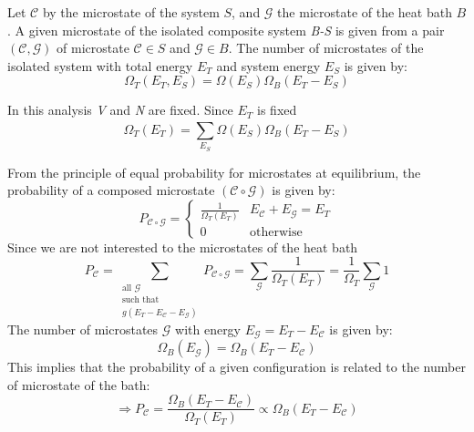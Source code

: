 \documentclass[../main/main.tex]{subfiles}
\begin{document}
Let \( \mathcal{C}  \) by the microstate of the system \( S \), and \( \mathcal{G}  \) the microstate of the heat bath \( B \).
A given microstate of the isolated composite system \emph{B-S} is given from a pair \( (\mathcal{C},\mathcal{G}  ) \) of microstate \( \mathcal{C} \in S  \) and   \( \mathcal{G} \in B  \).
The number of microstates of the isolated system with total energy \( E_T \) and system energy \( E_S \)  is given by:
\begin{equation}
  \Omega _T (E_T,E_S) = \Omega (E_S) \Omega _B (E_T - E_S)
\end{equation}
\begin{remark}
In this analysis \emph{V} and \emph{N} are fixed. Since \( E_T \) is fixed
\begin{equation}
  \Omega _T (E_T) = \sum_{E_S}^{} \Omega (E_S) \Omega _B (E_T - E_S)
\end{equation}
\end{remark}
From the principle of equal probability for microstates at equilibrium, the probability of a composed microstate \( (\mathcal{C} \circ \mathcal{G}  ) \) is given by:
\begin{equation}
P_{\mathcal{C} \circ \mathcal{G}} =
  \begin{cases}
   \frac{1}{\Omega _T (E_T)} & E_{\mathcal{C} } + E_{\mathcal{G} } = E_T \\
  0 & \text{otherwise}
  \end{cases}
\end{equation}
Since we are not interested to the microstates of the heat bath
\begin{equation}
  P_{\mathcal{C} } = \sum_{\substack{ \text{all } \mathcal{G}  \\  \text{such that}  \\ g (E_T -E_{\mathcal{C} } - E_{\mathcal{G} }) } }^{} P_{\mathcal{C} \circ \mathcal{G}}   = \sum_{\mathcal{G} }^{} \frac{1}{\Omega _T (E_T)} = \frac{1}{\Omega _T} \sum_{\mathcal{G} }^{}   1
\end{equation}
The number of microstates \( \mathcal{G}  \) with energy \( E_{\mathcal{G} }= E_T - E_{\mathcal{C} } \) is given by:
\begin{equation}
  \Omega _B (E_{\mathcal{G} }) = \Omega_B (E_T - E_{\mathcal{C} })
\end{equation}
This implies that the probability of a given configuration is related to the number of microstate of the bath:
\begin{equation}
  \Rightarrow   P_{\mathcal{C} }= \frac{\Omega _B (E_T - E_{\mathcal{C} })}{\Omega _T (E_T)} \propto \Omega _B (E_T - E_{\mathcal{C} })
\end{equation}
\end{document}
